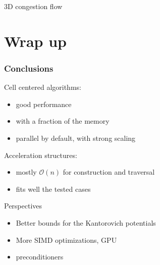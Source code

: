 \documentclass[aspectratio=169]{beamer}
\begin{document}
\begin{frame}
\begin{minipage}[c][0.8\textheight][c]{0.55\textwidth}
\begin{center}
            3D congestion flow
        \end{center}
    \end{minipage}
\end{frame}

\section{Wrap up}

\begin{frame}
    \frametitle{Conclusions}

    Cell centered algorithms:
    \begin{itemize}
        \item good performance
        \item with a fraction of the memory
        \item parallel by default, with strong scaling
    \end{itemize}
    
    \vfill
    Acceleration structures:
    \begin{itemize}
        \item mostly $\mathcal{O}( n )$ for construction and traversal
        \item fits well the tested cases
    \end{itemize}

    \vfill
    Perspectives
    \begin{itemize}
        \item Better bounds for the Kantorovich potentials
        \item More SIMD optimizations, GPU
        \item preconditioners
    \end{itemize}
\end{frame}
\end{document}
